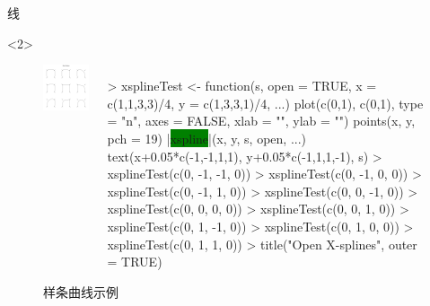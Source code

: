 \documentclass{beamerthemeMono}
\begin{document}
\begin{frame}[c,fragile]{\subsecname}{线}
\begin{onlyenv}<2>
\begin{figure}
  \begin{columns}
    \begin{column}[c]{.4\textwidth}
        \includegraphics[width=\columnwidth]{open-xspline.png}
    \end{column}

    \begin{column}[c]{.6\textwidth}
\begin{rcode}
> xsplineTest <- function(s, open = TRUE, x = c(1,1,3,3)/4, y = c(1,3,3,1)/4, ...) {
  plot(c(0,1), c(0,1), type = "n", axes = FALSE, xlab = "", ylab = "")
  points(x, y, pch = 19)
  |\colorbox{green}{xspline}|(x, y, s, open, ...)
  text(x+0.05*c(-1,-1,1,1), y+0.05*c(-1,1,1,-1), s)}
> xsplineTest(c(0, -1, -1, 0))
> xsplineTest(c(0, -1,  0, 0))
> xsplineTest(c(0, -1,  1, 0))
> xsplineTest(c(0,  0, -1, 0))
> xsplineTest(c(0,  0,  0, 0))
> xsplineTest(c(0,  0,  1, 0))
> xsplineTest(c(0,  1, -1, 0))
> xsplineTest(c(0,  1,  0, 0))
> xsplineTest(c(0,  1,  1, 0))
> title("Open X-splines", outer = TRUE)
\end{rcode}
    \end{column}
  \end{columns}
  \caption{样条曲线示例}
\end{figure}
\end{onlyenv}  
\end{frame}
\end{document}
